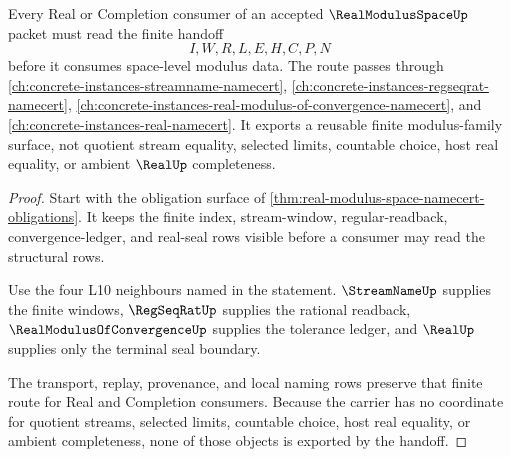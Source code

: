 \begin{theorem}
\label{thm:real-modulus-space-l10-handoff}
Every Real or Completion consumer of an accepted $\RealModulusSpaceUp$ packet
must read the finite handoff
$$
I,W,R,L,E,H,C,P,N
$$
before it consumes space-level modulus data. The route passes through
\autoref{ch:concrete-instances-streamname-namecert},
\autoref{ch:concrete-instances-regseqrat-namecert},
\autoref{ch:concrete-instances-real-modulus-of-convergence-namecert}, and
\autoref{ch:concrete-instances-real-namecert}. It exports a reusable finite
modulus-family surface, not quotient stream equality, selected limits,
countable choice, host real equality, or ambient $\RealUp$ completeness.
\end{theorem}
\begin{proof}
Start with the obligation surface of
\autoref{thm:real-modulus-space-namecert-obligations}. It keeps the finite
index, stream-window, regular-readback, convergence-ledger, and real-seal rows
visible before a consumer may read the structural rows.

Use the four L10 neighbours named in the statement. $\StreamNameUp$ supplies the
finite windows, $\RegSeqRatUp$ supplies the rational readback,
$\RealModulusOfConvergenceUp$ supplies the tolerance ledger, and $\RealUp$
supplies only the terminal seal boundary.

The transport, replay, provenance, and local naming rows preserve that finite
route for Real and Completion consumers. Because the carrier has no coordinate
for quotient streams, selected limits, countable choice, host real equality, or
ambient completeness, none of those objects is exported by the handoff.
\end{proof}

